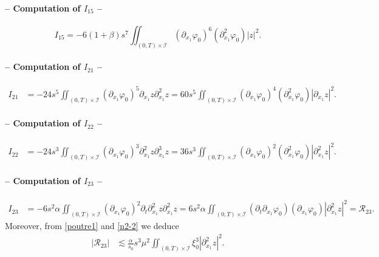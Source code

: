 \documentclass[a4paper, 12pt]{article}
\theoremstyle{plain}
\theoremstyle{definition}
\numberwithin{theorem}{section}
\numberwithin{equation}{section}
\begin{document}
{\paragraph{-- Computation of $I_{15}$ --}
$$I_{15}=-6(1+\beta)s^7\iint_{(0,T)\times\mathcal{I}}(\partial_{x_1}\varphi_0)^6(\partial^2_{x_1}\varphi_0)|z|^2.$$
\paragraph{-- Computation of $I_{21}$ --}
\begin{align*}
I_{21}&=-24s^5\iint_{(0,T)\times\mathcal{I}}(\partial_{x_1}\varphi_0)^5\partial_{x_1}z\partial^2_{x_1}z
=60s^5\iint_{(0,T)\times\mathcal{I}}(\partial_{x_1}\varphi_0)^4(\partial^2_{x_1}\varphi_0)|\partial_{x_1}z|^2.
\end{align*}
\paragraph{-- Computation of $I_{22}$ --}
\begin{align*}
I_{22}&=-24s^3\iint_{(0,T)\times\mathcal{I}}(\partial_{x_1}\varphi_0)^3\partial^2_{x_1}z\partial^3_{x_1}z
=36s^3\iint_{(0,T)\times\mathcal{I}}(\partial_{x_1}\varphi_0)^2(\partial^2_{x_1}\varphi_0)|\partial^2_{x_1}z|^2.
\end{align*}
\paragraph{-- Computation of $I_{23}$ --}
\begin{align*}
I_{23}&=-6s^2\alpha\iint_{(0,T)\times\mathcal{I}}(\partial_{x_1}\varphi_0)^2\partial_t\partial^2_{x_1}z\partial^2_{x_1}z
=6s^2\alpha\iint_{(0,T)\times\mathcal{I}}(\partial_t\partial_{x_1}\varphi_0)(\partial_{x_1}\varphi_0)|\partial^2_{x_1}z|^2=\mathcal{R}_{23}.
\end{align*}
Moreover, from \eqref{poutre1} and \eqref{n2-2} we deduce
\begin{align}
|\mathcal{R}_{23}|&\lesssim \frac{\alpha}{s_0} s^3\mu^2\iint_{(0,T)\times\mathcal{I}}\xi_0^3|\partial^2_{x_1}z|^2.\label{EstI23}
\end{align}
}
\end{document}
